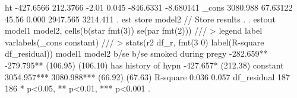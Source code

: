           ht {\VBAR}  -427.6566   212.3766    -2.01   0.045    -846.6331   -8.680141
       _cons {\VBAR}   3080.988   67.63122    45.56   0.000     2947.565    3214.411
{\smallskip}
. est store model2                                                                // Store results
{\smallskip}
. 
. estout model1 model2, cells(b(star fmt(3)) se(par fmt(2))) ///
>   legend label varlabels(_cons constant) ///
>   stats(r2 df_r, fmt(3 0) label(R-square df_residual))
{\smallskip}
                           model1          model2   
                             b/se            b/se   
smoked during preg{\tytilde}y     -282.659**      -279.795** 
                         (106.95)        (106.10)   
has history of hyp{\tytilde}n                     -427.657*  
                                         (212.38)   
constant                 3054.957***     3080.988***
                          (66.92)         (67.63)   
R-square                    0.036           0.057   
df_residual                   187             186   
* p<0.05, ** p<0.01, *** p<0.001
{\smallskip}
.   
